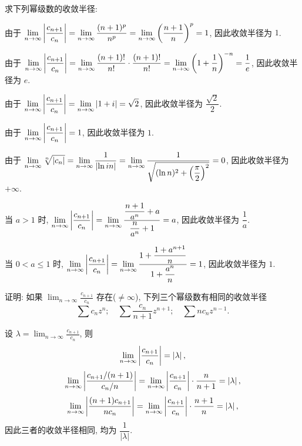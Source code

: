 \begin{exercise}[2]
	求下列幂级数的收敛半径:
\end{exercise}
\begin{solution}
	\subex 由于
	$\displaystyle\lim_{n\to\infty}\left|\frac{c_{n+1}}{c_n}\right|
	=\lim_{n\to\infty}\frac{(n+1)^p}{n^p}
	=\lim_{n\to\infty}\left(\frac{n+1}n\right)^p=1$,
	因此收敛半径为 $1$.

	\subex 由于
	$\displaystyle\lim_{n\to\infty}\left|\frac{c_{n+1}}{c_n}\right|
	=\lim_{n\to\infty}\frac{(n+1)!}{n!}\cdot\frac{(n+1)!}{n!}
	=\lim_{n\to\infty}\left(1+\frac1n\right)^{-n}=\frac1e$,
	因此收敛半径为 $e$.

	\subex 由于
	$\displaystyle\lim_{n\to\infty}\left|\frac{c_{n+1}}{c_n}\right|
	=\lim_{n\to\infty}\left|1+i\right|=\sqrt2$,
	因此收敛半径为 $\dfrac{\sqrt2}2$.

	\subex 由于
	$\displaystyle\lim_{n\to\infty}\left|\frac{c_{n+1}}{c_n}\right|=1$,
	因此收敛半径为 $1$.

	\subex 由于
	$\displaystyle\lim_{n\to\infty}\sqrt[n]{\left|c_n\right|}
	=\lim_{n\to\infty}\frac1{\left|\ln{in}\right|}
	=\lim_{n\to\infty}\frac1{\sqrt{(\ln n)^2+\left(\dfrac\pi2\right)^2}}=0$,
	因此收敛半径为 $+\infty$.

	\subex 当 $a>1$ 时,
	$\displaystyle\lim_{n\to\infty}\left|\frac{c_{n+1}}{c_n}\right|
	=\lim_{n\to\infty}\frac{\dfrac{n+1}{a^n}+a}{\dfrac n{a^n}+1}=a$,
	因此收敛半径为 $\dfrac1a$.

	当 $0<a\le1$ 时,
	$\displaystyle\lim_{n\to\infty}\left|\frac{c_{n+1}}{c_n}\right|
	=\lim_{n\to\infty}\frac{1+\dfrac{1+a^{n+1}}n}{1+\dfrac {a^n}n}=1$,
	因此收敛半径为 $1$.
\end{solution}


\begin{exercise}
	证明: 如果 $\displaystyle\lim_{n\to\infty}\frac{c_{n+1}}{c_n}$ 存在($\neq\infty$), 下列三个幂级数有相同的收敛半径
	\[\sum c_nz^n;\quad \sum \frac{c_n}{n+1}z^{n+1};\quad \sum nc_nz^{n-1}.\]
\end{exercise}
\begin{solution}[证明]
	设 $\lambda=\displaystyle\lim_{n\to\infty}\frac{c_{n+1}}{c_n}$, 则
	\[\lim_{n\to\infty}\left|\frac{c_{n+1}}{c_n}\right|=\left|\lambda\right|,\]
	\[\lim_{n\to\infty}\left|\frac{c_{n+1}/(n+1)}{c_n/n}\right|
	=\lim_{n\to\infty}\left|\frac{c_{n+1}}{c_n}\right|\cdot\frac{n}{n+1}
	=\left|\lambda\right|,\]
	\[\lim_{n\to\infty}\left|\frac{(n+1)c_{n+1}}{nc_n}\right|
	=\lim_{n\to\infty}\left|\frac{c_{n+1}}{c_n}\right|\cdot\frac{n+1}{n}
	=\left|\lambda\right|,\]
	因此三者的收敛半径相同, 均为 $\dfrac1{|\lambda|}$.
\end{solution}


